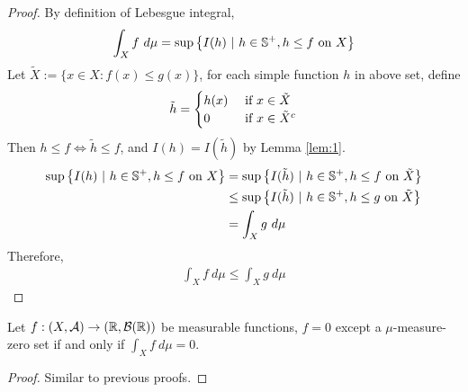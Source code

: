 \documentclass[11pt]{article}
\begin{document}
	\begin{proof}
		By definition of Lebesgue integral,
		\begin{align}
			\int_X f\ d\mu = \sup \left \{I(h)\ |\ h \in \mathbb{S}^+, h \leq f \text{{ on }} X \right\}
		\end{align}
		Let $\tilde{X} := \{x \in X: f(x) \leq g(x)\}$, for each simple function $h$ in above set, define
		\begin{align}
			\tilde{h} = \begin{cases}
				h(x) &\text{{ if }} x \in \tilde{X} \\
				0 &\text{{ if }} x \in \tilde{X}^c
			\end{cases}
		\end{align}
		Then $h \leq f \iff \tilde{h} \leq f$, and $I(h) = I(\tilde{h})$ by Lemma \ref{lem:1}.
		\begin{align}
			\sup \left \{I(h)\ |\ h \in \mathbb{S}^+, h \leq f \text{{ on }} X \right\} &= \sup \left \{I(\tilde{h})\ |\ {h} \in \mathbb{S}^+, {h} \leq f \text{{ on }} \tilde{X} \right\} \\
			&\leq \sup \left \{I(\tilde{h})\ |\ {h} \in \mathbb{S}^+, {h} \leq g \text{{ on }} \tilde{X} \right\} \\
			&= \int_X g\ d\mu
		\end{align}
		Therefore,
		\begin{align}
			\int_X f\ d\mu \leq \int_X g\ d\mu
		\end{align}
	\end{proof}

	\begin{theorem}
		Let $f: (X, \mathcal{{A}}) \to (\mathbb{R}, \mathcal{{B}}(\mathbb{R}))$ be measurable functions, $f = 0$ except a $\mu$-measure-zero set if and only if $\int_X f\ d\mu = 0$.
	\end{theorem}
	
	\begin{proof}
		Similar to previous proofs.
	\end{proof}
	
\end{document}
